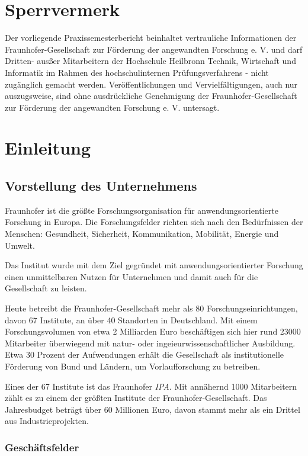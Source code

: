 \chapter{Sperrvermerk}
Der vorliegende Praxissemesterbericht beinhaltet vertrauliche Informationen der Fraunhofer-Gesellschaft zur Förderung der angewandten Forschung e. V. und darf Dritten- ausßer Mitarbeitern der Hochschule Heilbronn Technik, Wirtschaft und Informatik im Rahmen des hochschulinternen Prüfungsverfahrens - nicht zugänglich gemacht werden. Veröffentlichungen und Vervielfältigungen, auch nur auszugsweise, sind ohne ausdrückliche Genehmigung der Fraunhofer-Gesellschaft zur Förderung der angewandten Forschung e. V. untersagt.

\chapter{Einleitung}
\section{Vorstellung des Unternehmens}
Fraunhofer ist die größte Forschungsorganisation für anwendungsorientierte Forschung in Europa. Die Forschungsfelder richten sich nach den Bedürfnissen der Menschen:
Gesundheit, Sicherheit, Kommunikation, Mobilität, Energie und Umwelt.

Das Institut wurde mit dem Ziel gegründet mit anwendungsorientierter Forschung einen unmittelbaren Nutzen für Unternehmen und damit auch für die Gesellschaft zu leisten.

Heute betreibt die Fraunhofer-Gesellschaft mehr als 80 Forschungseinrichtungen, davon 67 Institute, an über 40 Standorten in Deutschland. Mit einem Forschungsvolumen von
etwa 2 Milliarden Euro beschäftigen sich hier rund 23000 Mitarbeiter überwiegend mit natur- oder ingeieurwissenschaftlicher Ausbildung. Etwa 30 Prozent der Aufwendungen erhält
die Gesellschaft als institutionelle Förderung von Bund und Ländern, um Vorlaufforschung zu betreiben.

Eines der 67 Institute ist das Fraunhofer \emph{IPA}. Mit annähernd 1000 Mitarbeitern zählt es zu einem der größten Institute der Fraunhofer-Gesellschaft. Das Jahresbudget
beträgt über 60 Millionen Euro, davon stammt mehr als ein Drittel aus Industrieprojekten.

\subsection{Geschäftsfelder}

